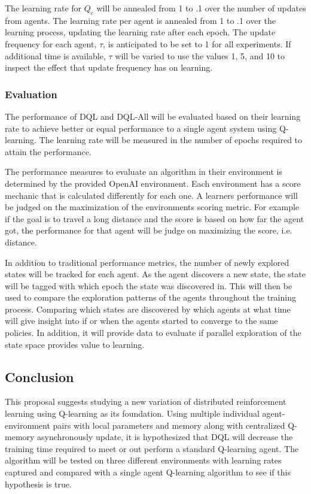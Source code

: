 \documentclass[jair,twoside,11pt,theapa]{article}
\begin{document}
The learning rate for $Q_c$ will be annealed from 1 to .1 over the number of updates from agents. The learning rate per agent is annealed from 1 to .1 over the learning process, updating the learning rate after each epoch. The update frequency for each agent, $\tau$, is anticipated to be set to 1 for all experiments. If additional time is available, $\tau$ will be varied 
to use the values 1, 5, and 10 to inspect the effect that update frequency has on learning. 

\subsubsection{Evaluation}
The performance of DQL and DQL-All will be evaluated based on their learning rate to achieve better or equal performance to a single agent system using Q-learning. 
The learning rate will be measured in the number of epochs required to attain the performance. 

The performance measures to evaluate an algorithm in their environment is determined by the provided OpenAI environment. Each environment has a score mechanic that is calculated
differently for each one. A learners performance will be judged on the maximization of the environments scoring metric. For example if the goal is to travel a long distance and the score 
is based on how far the agent got, the performance for that agent will be judge on maximizing the score, i.e. distance. 

In addition to traditional performance metrics, the number of newly explored states will be tracked for each agent. As the agent discovers a new state, the state will be tagged with which epoch
the state was discovered in. This will then be used to compare the exploration patterns of the agents throughout the training process. Comparing which states are discovered by which agents at what time
will give insight into if or when the agents started to converge to the same policies. In addition, it will provide data to evaluate if parallel exploration of the state space provides value to learning. 

\subsection{Conclusion}
This proposal suggests studying a new variation of distributed reinforcement learning using Q-learning as its foundation. Using multiple individual agent-environment pairs with local parameters and memory along with centralized Q-memory asynchronously update, it is hypothesized that DQL will decrease the training time required to meet or out perform a standard Q-learning agent. The algorithm will be tested on three different environments with learning rates captured and compared with a single agent Q-learning algorithm to see if this hypothesis is true.

\vskip 0.2in


\end{document}
